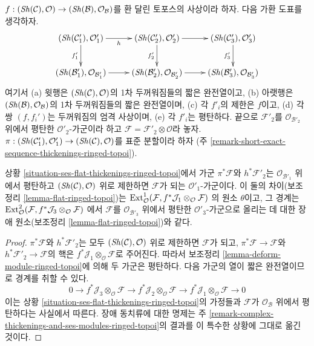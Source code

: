 \begin{situation}
\label{situation-ses-flat-thickenings-ringed-topoi}
$f : (\mathop{\mathit{Sh}}\nolimits(\mathcal{C}), \mathcal{O}) \to
(\mathop{\mathit{Sh}}\nolimits(\mathcal{B}), \mathcal{O}_\mathcal{B})$를 환 달린 토포스의 사상이라
하자. 다음 가환 도표를 생각하자.
$$
\xymatrix{
(\Sh(\mathcal{C}'_1), \mathcal{O}'_1) \ar[r]_h \ar[d]_{f'_1} &
(\Sh(\mathcal{C}'_2), \mathcal{O}'_2) \ar[r] \ar[d]_{f'_2} &
(\Sh(\mathcal{C}'_3), \mathcal{O}'_3) \ar[d]_{f'_3} \\
(\Sh(\mathcal{B}'_1), \mathcal{O}_{\mathcal{B}'_1}) \ar[r] &
(\Sh(\mathcal{B}'_2), \mathcal{O}_{\mathcal{B}'_2}) \ar[r] &
(\Sh(\mathcal{B}'_3), \mathcal{O}_{\mathcal{B}'_3})
}
$$
여기서 (a) 윗행은 $(\mathop{\mathit{Sh}}\nolimits(\mathcal{C}), \mathcal{O})$의 1차 두꺼워짐들의
짧은 완전열이고, (b) 아랫행은
$(\mathop{\mathit{Sh}}\nolimits(\mathcal{B}), \mathcal{O}_\mathcal{B})$의 1차 두꺼워짐들의 짧은
완전열이며, (c) 각 $f'_i$의 제한은 $f$이고, (d) 각 쌍 $(f, f_i')$는
두꺼워짐의 엄격 사상이며, (e) 각 $f'_i$는 평탄하다. 끝으로
$\mathcal{F}'_2$를 $\mathcal{O}_{\mathcal{B}'_2}$ 위에서 평탄한
$\mathcal{O}'_2$-가군이라 하고
$\mathcal{F} = \mathcal{F}'_2 \otimes \mathcal{O}$라 놓자.
$\pi : (\mathop{\mathit{Sh}}\nolimits(\mathcal{C}'_1), \mathcal{O}'_1) \to
(\mathop{\mathit{Sh}}\nolimits(\mathcal{C}), \mathcal{O})$를 표준 분할이라 하자
(주 \ref{remark-short-exact-sequence-thickenings-ringed-topoi}).
\end{situation}

\begin{lemma}
\label{lemma-verify-iv-ringed-topoi}
상황 \ref{situation-ses-flat-thickenings-ringed-topoi}에서 가군
$\pi^*\mathcal{F}$와 $h^*\mathcal{F}'_2$는
$\mathcal{O}_{\mathcal{B}'_1}$ 위에서 평탄하고
$(\mathop{\mathit{Sh}}\nolimits(\mathcal{C}), \mathcal{O})$ 위로 제한하면 $\mathcal{F}$가 되는
$\mathcal{O}'_1$-가군이다. 이 둘의 차이(보조정리
\ref{lemma-flat-ringed-topoi})는
$\mathop{\mathrm{Ext}}\nolimits^1_\mathcal{O}(\mathcal{F},
f^*\mathcal{J}_1 \otimes_\mathcal{O} \mathcal{F})$
의 원소 $\theta$이고, 그 경계는
$\mathop{\mathrm{Ext}}\nolimits^2_\mathcal{O}(\mathcal{F},
f^*\mathcal{J}_3 \otimes_\mathcal{O} \mathcal{F})$
에서 $\mathcal{F}$를 $\mathcal{O}_{\mathcal{B}'_3}$ 위에서 평탄한
$\mathcal{O}'_3$-가군으로 올리는 데 대한 장애 원소(보조정리
\ref{lemma-flat-ringed-topoi})와 같다.
\end{lemma}

\begin{proof}
$\pi^*\mathcal{F}$와 $h^*\mathcal{F}'_2$는 모두
$(\mathop{\mathit{Sh}}\nolimits(\mathcal{C}), \mathcal{O})$ 위로 제한하면 $\mathcal{F}$가 되고,
$\pi^*\mathcal{F} \to \mathcal{F}$와
$h^*\mathcal{F}'_2 \to \mathcal{F}$의 핵은
$f^*\mathcal{J}_1 \otimes_\mathcal{O} \mathcal{F}$로 주어진다. 따라서
보조정리 \ref{lemma-deform-module-ringed-topoi}에 의해 두 가군은
평탄하다. 다음 가군의 열이 짧은 완전열이므로 경계를 취할 수 있다.
$$
0 \to f^*\mathcal{J}_3 \otimes_\mathcal{O} \mathcal{F} \to
f^*\mathcal{J}_2 \otimes_\mathcal{O} \mathcal{F} \to
f^*\mathcal{J}_1 \otimes_\mathcal{O} \mathcal{F} \to 0
$$
이는 상황 \ref{situation-ses-flat-thickenings-ringed-topoi}의 가정들과
$\mathcal{F}$가 $\mathcal{O}_\mathcal{B}$ 위에서 평탄하다는 사실에서
따른다. 장애 동치류에 대한 명제는 주
\ref{remark-complex-thickenings-and-ses-modules-ringed-topoi}의 결과를 이
특수한 상황에 그대로 옮긴 것이다.
\end{proof}







